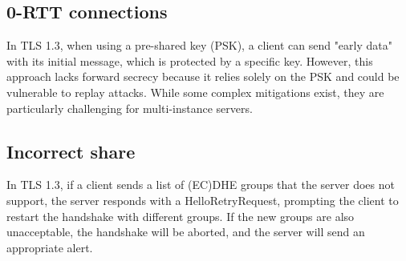 \subsection{0-RTT connections}
In TLS 1.3, when using a pre-shared key (PSK), a client can send
"early data" with its initial message, which is protected by a
specific key. However, this approach lacks forward secrecy because it
relies solely on the PSK and could be vulnerable to replay attacks.
While some complex mitigations exist, they are particularly
challenging for multi-instance servers.

\subsection{Incorrect share}
In TLS 1.3, if a client sends a list of (EC)DHE groups that the server
does not support, the server responds with a HelloRetryRequest,
prompting the client to restart the handshake with different groups.
If the new groups are also unacceptable, the handshake will be
aborted, and the server will send an appropriate alert.

